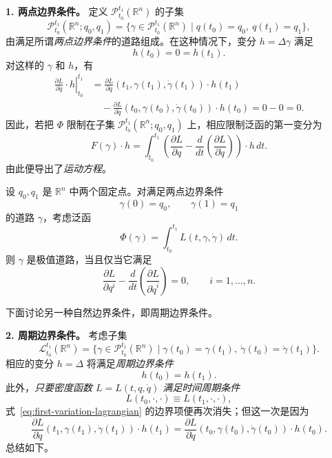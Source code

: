 \medskip
\noindent\textbf{1. 两点边界条件。}
定义 $\mathcal P_{t_0}^{t_1}(\mathbb R^n)$ 的子集
\begin{equation}\label{eq:two-point-path-space}
  \mathcal P_{t_0}^{t_1}(\mathbb R^n;q_0,q_1)
  =\{\gamma\in\mathcal P_{t_0}^{t_1}(\mathbb R^n)
  \mid q(t_0)=q_0,\ q(t_1)=q_1\},
\end{equation}
由满足所谓\emph{两点边界条件}的道路组成。在这种情况下，变分 $h=\Delta\gamma$ 满足
\[
  h(t_0)=0=h(t_1).
\]
对这样的 $\gamma$ 和 $h$，有
\begin{align*}
  \left.\frac{\partial L}{\partial\dot q}\cdot h\right|_{t_0}^{t_1}
  &=\frac{\partial L}{\partial\dot q}(t_1,\gamma(t_1),\dot\gamma(t_1))\cdot h(t_1)\\
  &\quad-\frac{\partial L}{\partial\dot q}(t_0,\gamma(t_0),\dot\gamma(t_0))\cdot h(t_0)
  =0-0=0.
\end{align*}
因此，若把 $\Phi$ 限制在子集 $\mathcal P_{t_0}^{t_1}(\mathbb R^n;q_0,q_1)$ 上，相应限制泛函的第一变分为
\begin{equation}\label{eq:first-variation-two-point}
  F(\gamma)\cdot h
  =\int_{t_0}^{t_1}\left(
    \frac{\partial L}{\partial q}
    -\frac d{dt}\left(\frac{\partial L}{\partial\dot q}\right)
  \right)\cdot h\,dt.
\end{equation}
由此便导出了\emph{运动方程}。

\begin{proposition}
\label{prop:euler-lagrange-two-point}
设 $q_0,q_1$ 是 $\mathbb R^n$ 中两个固定点。对满足两点边界条件
\[
  \gamma(0)=q_0,\qquad\gamma(1)=q_1
\]
的道路 $\gamma$，考虑泛函
\[
  \Phi(\gamma)=\int_{t_0}^{t_1}L(t,\gamma,\dot\gamma)\,dt.
\]
则 $\gamma$ 是极值道路，当且仅当它满足
\begin{equation}\label{eq:euler-lagrange}
  \frac{\partial L}{\partial q^i}
  -\frac d{dt}\left(\frac{\partial L}{\partial\dot q^i}\right)=0,
  \qquad i=1,\ldots,n.
\end{equation}
\end{proposition}

下面讨论另一种自然边界条件，即周期边界条件。

\medskip
\noindent\textbf{2. 周期边界条件。}
考虑子集
\[
  \mathcal L_{t_0}^{t_1}(\mathbb R^n)
  =\{\gamma\in\mathcal P_{t_0}^{t_1}(\mathbb R^n)
  \mid\gamma(t_0)=\gamma(t_1),\ \dot\gamma(t_0)=\dot\gamma(t_1)\}.
\]
相应的变分 $h=\Delta$ 将满足\emph{周期边界条件}
\[
  h(t_0)=h(t_1).
\]
此外，\emph{只要密度函数 $L=L(t,q,\dot q)$ 满足时间周期条件}
\begin{equation}\label{eq:lagrangian-time-periodic}
  L(t_0,\cdot,\cdot)\equiv L(t_1,\cdot,\cdot),
\end{equation}
式~\eqref{eq:first-variation-lagrangian} 的边界项便再次消失；但这一次是因为
\[
  \frac{\partial L}{\partial\dot q}(t_1,\gamma(t_1),\dot\gamma(t_1))\cdot h(t_1)
  =\frac{\partial L}{\partial\dot q}(t_0,\gamma(t_0),\dot\gamma(t_0))\cdot h(t_0).
\]
总结如下。

